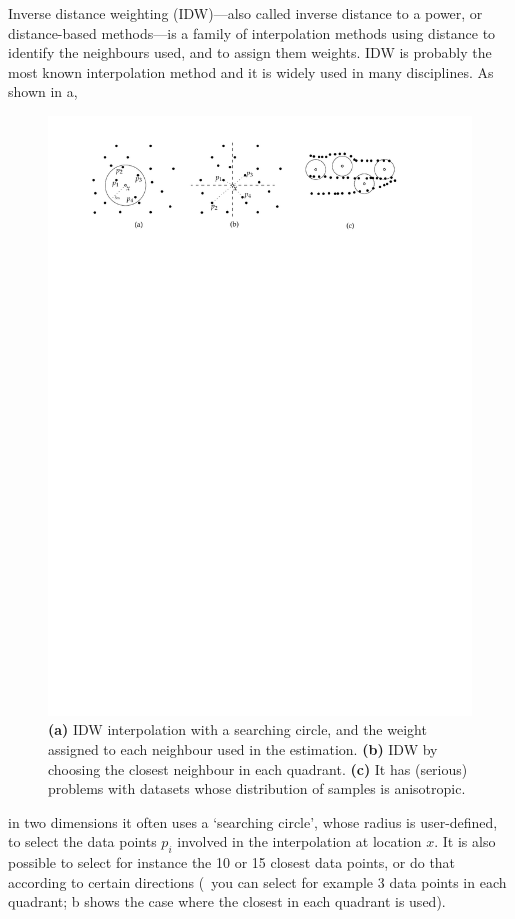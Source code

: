 Inverse distance weighting (IDW)---also called inverse distance to a power, or distance-based methods---is a family of interpolation methods using distance to identify the neighbours used, and to assign them weights.
IDW is probably the most known interpolation method and it is widely used in many disciplines.
As shown in a,
\begin{figure}
  \centering
  \includegraphics[width=\textwidth]{figs/idw}
  \caption{\textbf{(a)} IDW interpolation with a searching circle, and the weight assigned to each neighbour used in the estimation. \textbf{(b)} IDW by choosing the closest neighbour in each quadrant. \textbf{(c)} It has (serious) problems with datasets whose distribution of samples is anisotropic.} %
\end{figure}
in two dimensions it often uses a `searching circle', whose radius is user-defined, to select the data points $p_i$ involved in the interpolation at location $x$. 
It is also possible to select for instance the 10 or 15 closest data points, or do that according to certain directions (\ie\ you can select for example 3 data points in each quadrant; b shows the case where the closest in each quadrant is used). 

